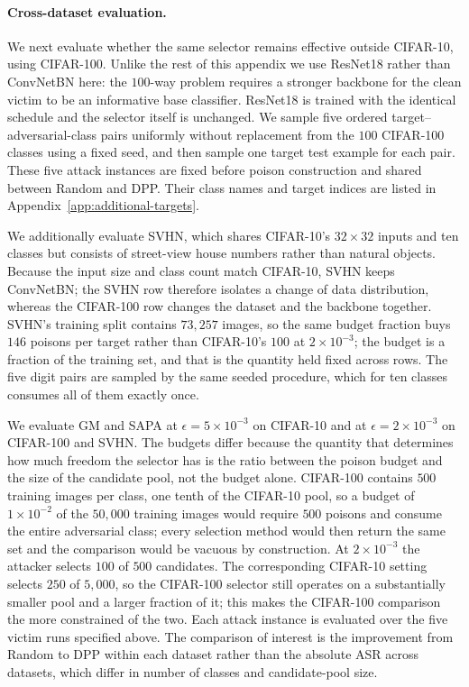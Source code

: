 \paragraph{Cross-dataset evaluation.}
We next evaluate whether the same selector remains effective outside
CIFAR-10, using CIFAR-100. Unlike the rest of this appendix we use
ResNet18 rather than ConvNetBN here: the $100$-way problem requires a
stronger backbone for the clean victim to be an informative base
classifier. ResNet18 is trained with the identical schedule and the
selector itself is unchanged. We sample five ordered
target--adversarial-class pairs uniformly without replacement from the
$100$ CIFAR-100 classes using a fixed seed, and then sample one target
test example for each pair. These five attack instances are fixed before
poison construction and shared between Random and DPP. Their class names
and target indices are listed in
Appendix~\ref{app:additional-targets}.

We additionally evaluate SVHN, which shares CIFAR-10's $32\times32$ inputs
and ten classes but consists of street-view house numbers rather than
natural objects. Because the input size and class count match CIFAR-10,
SVHN keeps ConvNetBN; the SVHN row therefore isolates a change of data
distribution, whereas the CIFAR-100 row changes the dataset and the
backbone together. SVHN's training split contains $73{,}257$ images, so
the same budget fraction buys $146$ poisons per target rather than
CIFAR-10's $100$ at $2\times10^{-3}$; the budget is a fraction of the
training set, and that is the quantity held fixed across rows. The five
digit pairs are sampled by the same seeded procedure, which for ten
classes consumes all of them exactly once.

We evaluate GM and SAPA at $\epsilon=5\times10^{-3}$ on CIFAR-10 and at
$\epsilon=2\times10^{-3}$ on CIFAR-100 and SVHN. The budgets differ because the
quantity that determines how much freedom the selector has is the ratio
between the poison budget and the size of the candidate pool, not the
budget alone. CIFAR-100 contains $500$ training images per class, one
tenth of the CIFAR-10 pool, so a budget of $1\times10^{-2}$ of the
$50{,}000$ training images would require $500$ poisons and consume the
entire adversarial class; every selection method would then return the
same set and the comparison would be vacuous by construction. At
$2\times10^{-3}$ the attacker selects $100$ of $500$ candidates. The
corresponding CIFAR-10 setting selects $250$ of $5{,}000$, so the
CIFAR-100 selector still operates on a substantially smaller pool and a
larger fraction of it; this makes the CIFAR-100 comparison the more
constrained of the two. Each attack instance is evaluated over the five
victim runs specified above. The comparison of interest is the
improvement from Random to DPP within each dataset rather than the
absolute ASR across datasets, which differ in number of classes and
candidate-pool size.

